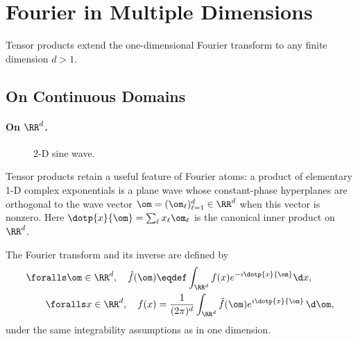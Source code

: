\section{Fourier in Multiple Dimensions}
\label{sec-fourier-multiple-dim}

Tensor products extend the one-dimensional Fourier transform to any finite dimension $d>1$.


                                                
\subsection{On Continuous Domains}

   
\paragraph{On \texorpdfstring{$\RR^d$}{Euclidean Space}.}

\begin{figure}[tbp]
\centering
{}
\caption{2-D sine wave.}
\label{fig-review-fourier-wave}
\end{figure}
Tensor products retain a useful feature of Fourier atoms: a product of elementary 1-D complex exponentials is a plane wave
whose constant-phase hyperplanes are orthogonal to the wave vector $\om=(\om_\ell)_{\ell=1}^d \in \RR^d$ when this vector is nonzero. Here $\dotp{x}{\om} = \sum_\ell x_\ell \om_\ell$ is the canonical inner product on $\RR^d$.

The Fourier transform and its inverse are defined by
\begin{align*}
	\foralls \om \in \RR^d, \quad \hat f(\om) &\eqdef \int_{\RR^d} f(x) e^{-\imath\dotp{x}{\om}} \d x, \\
	\foralls x \in \RR^d, \quad  f(x) &= \frac{1}{(2\pi)^d} \int_{\RR^d}\hat f(\om)e^{\imath\dotp{x}{\om}}\,\d\om,
\end{align*}
under the same integrability assumptions as in one dimension.




